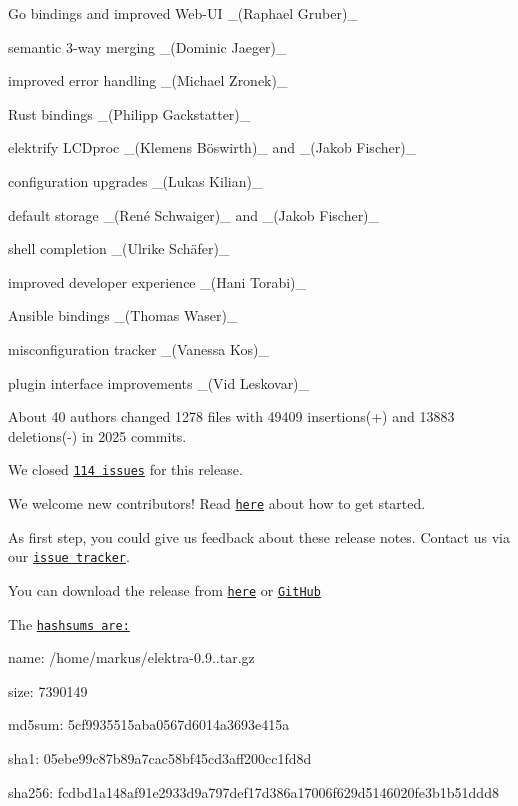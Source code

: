\begin{DoxyItemize}
\item Go bindings and improved Web-\/\+UI \+\_\+(\+Raphael Gruber)\+\_\+
\item semantic 3-\/way merging \+\_\+(\+Dominic Jaeger)\+\_\+
\item improved error handling \+\_\+(\+Michael Zronek)\+\_\+
\item Rust bindings \+\_\+(\+Philipp Gackstatter)\+\_\+
\item elektrify L\+C\+Dproc \+\_\+(Klemens Böswirth)\+\_\+ and \+\_\+(\+Jakob Fischer)\+\_\+
\item configuration upgrades \+\_\+(\+Lukas Kilian)\+\_\+
\item default storage \+\_\+(René Schwaiger)\+\_\+ and \+\_\+(\+Jakob Fischer)\+\_\+
\item shell completion \+\_\+(Ulrike Schäfer)\+\_\+
\item improved developer experience \+\_\+(\+Hani Torabi)\+\_\+
\item Ansible bindings \+\_\+(\+Thomas Waser)\+\_\+
\item misconfiguration tracker \+\_\+(\+Vanessa Kos)\+\_\+
\item plugin interface improvements \+\_\+(\+Vid Leskovar)\+\_\+
\end{DoxyItemize}

About 40 authors changed 1278 files with 49409 insertions(+) and 13883 deletions(-\/) in 2025 commits.

We closed \href{https://github.com/ElektraInitiative/libelektra/milestone/20?closed=1}{\tt 114 issues} for this release.

We welcome new contributors! Read \href{https://www.libelektra.org/devgettingstarted/ideas}{\tt here} about how to get started.

As first step, you could give us feedback about these release notes. Contact us via our \href{https://issues.libelektra.org}{\tt issue tracker}.

You can download the release from \href{https://www.libelektra.org/ftp/elektra/releases/elektra-0.9.0.tar.gz}{\tt here} or \href{https://github.com/ElektraInitiative/ftp/blob/master/releases/elektra-0.9.0.tar.gz?raw=true}{\tt Git\+Hub}

The \href{https://github.com/ElektraInitiative/ftp/blob/master/releases/elektra-0.9.0.tar.gz.hashsum?raw=true}{\tt hashsums are\+:}


\begin{DoxyItemize}
\item name\+: /home/markus/elektra-\/0.9..\+tar.\+gz
\item size\+: 7390149
\item md5sum\+: 5cf9935515aba0567d6014a3693e415a
\item sha1\+: 05ebe99c87b89a7cac58bf45cd3aff200cc1fd8d
\item sha256\+: fcdbd1a148af91e2933d9a797def17d386a17006f629d5146020fe3b1b51ddd8
\end{DoxyItemize}

